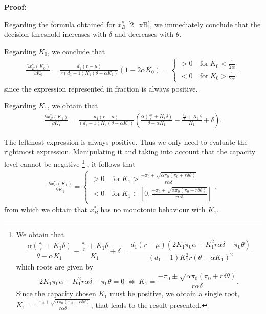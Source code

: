 \textbf{Proof:}

Regarding the formula obtained for  $x^*_B$ \eqref{2_xB}, we immediately conclude that the decision threshold increases with $\delta$ and decreases with $\theta$.


Regarding $K_0$, we conclude that
\begin{align*}
\frac{\partial x^*_B ( K_0 ) }{\partial K_0}= 
\frac{d_1 (r-\mu )}{r (d_1-1)K_1(\theta-\alpha K_1)} (1-2\alpha K_0)
=
\begin{cases}
>0 &\ \text{for} \ K_0<\frac{1}{2 \alpha}\\
<0 &\ \text{for} \ K_0>\frac{1}{2 \alpha}
\end{cases}.
\end{align*}
since the expression represented in fraction is always positive.


Regarding $K_1$, we obtain that
\begin{align*}
\frac{\partial x^*_B ( K_1 ) }{\partial K_1}= 
\frac{d_1 (r-\mu )}{ (d_1-1)K_1(\theta-\alpha K_1)}  \left( \frac{\alpha (\frac{\pi_0}{r}+K_1 \delta )}{\theta-\alpha K_1} -\frac{ \frac{\pi_0}{r}+K_1 \delta }{K_1}+ \delta \right).
\end{align*}


The leftmost expression is always positive. Thus we only need to evaluate the rightmost expression. Manipulating it and taking into account that the capacity level cannot be negative
\footnote{We obtain that 
	$$\frac{\alpha (\frac{\pi_0}{r}+K_1 \delta )}{\theta-\alpha K_1} -\frac{ \frac{\pi_0}{r}+K_1 \delta }{K_1}+ \delta =
\frac{d_1 (r-\mu) (2K_1 \pi_0 \alpha+K^2_1r \alpha \delta -\pi_0 \theta)}{(d_1-1)K_1^2r(\theta-\alpha K_1)^2}$$
which roots are given by 
$$ 2K_1 \pi_0 \alpha+K^2_1r \alpha \delta -\pi_0 \theta =0  \ \Leftrightarrow \ K_1=\frac{-\pi_0 \pm \sqrt{\alpha \pi_0 (\pi_0 + r \delta \theta)}}{ r\alpha \delta}.
$$
Since the capacity chosen $K_1$ must be positive, we obtain a single root, $K_1=\frac{-\pi_0 + \sqrt{\alpha \pi_0 (\pi_0 + r \delta \theta)}}{ r\alpha \delta}$, that leads to the result presented.}
, it follows that
\begin{align*}
\frac{\partial x^*_B ( K_1 ) }{\partial K_1}= 
\begin{cases}
>0 &\ \text{for} \ K_1>\frac{-\pi_0+\sqrt{\alpha \pi_0 (\pi_0 + r \delta \theta)}}{ r\alpha \delta}\\
<0 &\ \text{for} \ K_1 \in \left[ 0, \frac{-\pi_0+\sqrt{\alpha \pi_0(\pi_0 + r \delta \theta)}}{ r\alpha \delta} \right]
\end{cases},
\end{align*}
from which we obtain that $x^*_B$ has no monotonic behaviour with $K_1$.


